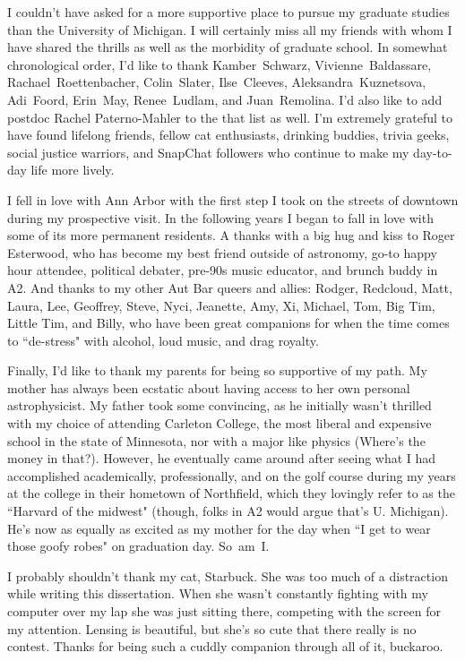 I couldn't have asked for a more supportive place to pursue my graduate studies than the University of Michigan. I will certainly miss all my friends with whom I have shared the thrills as well as the morbidity of graduate school. In somewhat chronological order, I'd like to thank Kamber~Schwarz, Vivienne~Baldassare, Rachael~Roettenbacher, Colin~Slater, Ilse~Cleeves, Aleksandra~Kuznetsova, Adi~Foord, Erin~May, Renee~Ludlam, and Juan~Remolina. I'd also like to add postdoc Rachel Paterno-Mahler to the that list as well. I'm extremely grateful to have found lifelong friends, fellow cat enthusiasts, drinking buddies, trivia geeks, social justice warriors, and SnapChat followers who continue to make my day-to-day life more lively.

I fell in love with Ann Arbor with the first step I took on the streets of downtown during my prospective visit. In the following years I began to fall in love with some of its more permanent residents. A thanks with a big hug and kiss to Roger Esterwood, who has become my best friend outside of astronomy, go-to happy hour attendee, political debater, pre-90s music educator, and brunch buddy in A2. And thanks to my other Aut Bar queers and allies: Rodger, Redcloud, Matt, Laura, Lee, Geoffrey, Steve, Nyci, Jeanette, Amy, Xi, Michael, Tom, Big Tim, Little Tim, and Billy, who have been great companions for when the time comes to ``de-stress" with alcohol, loud music, and drag royalty.

Finally, I'd like to thank my parents for being so supportive of my path. My mother has always been ecstatic about having access to her own personal astrophysicist. My father took some convincing, as he initially wasn't thrilled with my choice of attending Carleton College, the most liberal and expensive school in the state of Minnesota, nor with a major like physics (Where's the money in that?). However, he eventually came around after seeing what I had accomplished academically, professionally, and on the golf course during my years at the college in their hometown of Northfield, which they lovingly refer to as the ``Harvard of the midwest" (though, folks in A2 would argue that's U. Michigan). He's now as equally as excited as my mother for the day when ``I get to wear those goofy robes" on graduation day. So~am~I.

I probably shouldn't thank my cat, Starbuck. She was too much of a distraction while writing this dissertation. When she wasn't constantly fighting with my computer over my lap she was just sitting there, competing with the screen for my attention. Lensing is beautiful, but she's so cute that there really is no contest. Thanks for being such a cuddly companion through all of it, buckaroo.
